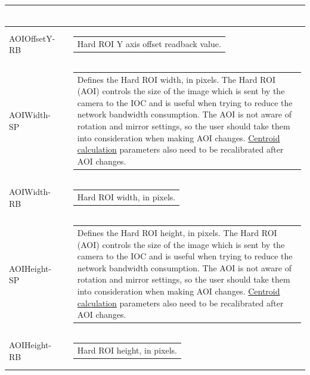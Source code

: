 \documentclass[openany]{article}
\begin{document}
\begin{longtable}{| m{3.0cm} m{4.5cm} m{7.0cm} |}
\begin{tabular}{@{}m{6cm}@{}}
            \end{tabular} \\ \hline
        AOIOffsetY-RB &  & \begin{tabular}{@{}m{6cm}@{}}
                Hard ROI Y axis offset readback value.
            \end{tabular} \hypertarget{pv:hard-roi-width}{}\\ \hline
        AOIWidth-SP &  & \begin{tabular}{@{}m{6cm}@{}}
                Defines the Hard ROI width, in pixels. The Hard ROI (AOI) controls the size
                of the image which is sent by the camera to the IOC and is useful when
                trying to reduce the network bandwidth consumption. The AOI is not aware of
                rotation and mirror settings, so the user should take them into
                consideration when making AOI changes. \hyperref[sec:centroid-calc]{Centroid
                calculation} parameters also need to be recalibrated after AOI changes.
            \end{tabular} \\ \hline
        AOIWidth-RB &  & \begin{tabular}{@{}m{6cm}@{}}
                Hard ROI width, in pixels.
            \end{tabular} \hypertarget{pv:hard-roi-height}{}\\ \hline
        AOIHeight-SP &  & \begin{tabular}{@{}m{6cm}@{}}
                Defines the Hard ROI height, in pixels. The Hard ROI (AOI) controls the size
                of the image which is sent by the camera to the IOC and is useful when
                trying to reduce the network bandwidth consumption. The AOI is not aware of
                rotation and mirror settings, so the user should take them into
                consideration when making AOI changes. \hyperref[sec:centroid-calc]{Centroid
                calculation} parameters also need to be recalibrated after AOI changes.
            \end{tabular} \\ \hline
        AOIHeight-RB &  & \begin{tabular}{@{}m{6cm}@{}}
                Hard ROI height, in pixels.
            \end{tabular} \hypertarget{pv:hard-roi-auto-center-x}{}\\ \hline

\end{longtable}
\end{document}

